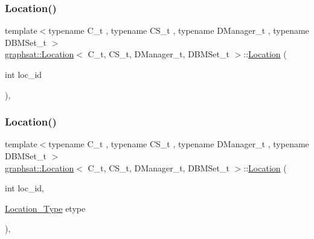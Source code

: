\subsubsection{\texorpdfstring{Location()}{Location()}\hspace{0.1cm}{\footnotesize\ttfamily [1/2]}}
{\footnotesize\ttfamily template$<$typename C\+\_\+t , typename C\+S\+\_\+t , typename D\+Manager\+\_\+t , typename D\+B\+M\+Set\+\_\+t $>$ \\
\mbox{\hyperlink{classgraphsat_1_1_location}{graphsat\+::\+Location}}$<$ C\+\_\+t, C\+S\+\_\+t, D\+Manager\+\_\+t, D\+B\+M\+Set\+\_\+t $>$\+::\mbox{\hyperlink{classgraphsat_1_1_location}{Location}} (\begin{DoxyParamCaption}\item[{int}]{loc\+\_\+id }\end{DoxyParamCaption})\hspace{0.3cm}{\ttfamily [inline]}, {\ttfamily [explicit]}}

\mbox{\label{classgraphsat_1_1_location_a54af3c3776b46f3fa786356b5d626507}} 
\subsubsection{\texorpdfstring{Location()}{Location()}\hspace{0.1cm}{\footnotesize\ttfamily [2/2]}}
{\footnotesize\ttfamily template$<$typename C\+\_\+t , typename C\+S\+\_\+t , typename D\+Manager\+\_\+t , typename D\+B\+M\+Set\+\_\+t $>$ \\
\mbox{\hyperlink{classgraphsat_1_1_location}{graphsat\+::\+Location}}$<$ C\+\_\+t, C\+S\+\_\+t, D\+Manager\+\_\+t, D\+B\+M\+Set\+\_\+t $>$\+::\mbox{\hyperlink{classgraphsat_1_1_location}{Location}} (\begin{DoxyParamCaption}\item[{int}]{loc\+\_\+id,  }\item[{\mbox{\hyperlink{namespacegraphsat_a2ea948010388eb8178aa254a3b2023c9}{Location\+\_\+\+Type}}}]{etype }\end{DoxyParamCaption})\hspace{0.3cm}{\ttfamily [inline]}, {\ttfamily [explicit]}}



